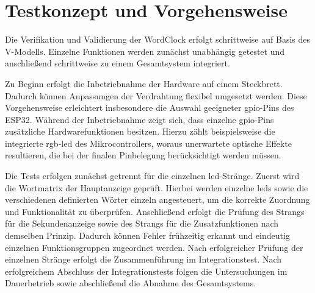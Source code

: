 \section{Testkonzept und Vorgehensweise}
Die Verifikation und Validierung der WordClock erfolgt schrittweise auf Basis des V-Modells. 
Einzelne Funktionen werden zunächst unabhängig getestet und anschließend schrittweise zu einem Gesamtsystem integriert.  

Zu Beginn erfolgt die Inbetriebnahme der Hardware auf einem Steckbrett.  
Dadurch können Anpassungen der Verdrahtung flexibel umgesetzt werden.  
Diese Vorgehensweise erleichtert insbesondere die Auswahl geeigneter \gls{gpio}-Pins des ESP32.  
Während der Inbetriebnahme zeigt sich, dass einzelne \gls{gpio}-Pins zusätzliche Hardwarefunktionen besitzen.  
Hierzu zählt beispielsweise die integrierte \gls{rgb}-\gls{led} des Mikrocontrollers, woraus unerwartete optische Effekte resultieren, die bei der finalen Pinbelegung berücksichtigt werden müssen.

Die Tests erfolgen zunächst getrennt für die einzelnen \gls{led}-Stränge.  
Zuerst wird die Wortmatrix der Hauptanzeige geprüft. 
Hierbei werden einzelne \gls{led}s sowie die verschiedenen definierten Wörter einzeln angesteuert, um die korrekte Zuordnung und Funktionalität zu überprüfen.  
Anschließend erfolgt die Prüfung des Strangs für die Sekundenanzeige sowie des Strangs für die Zusatzfunktionen nach demselben Prinzip.  
Dadurch können Fehler frühzeitig erkannt und eindeutig einzelnen Funktionsgruppen zugeordnet werden.  
Nach erfolgreicher Prüfung der einzelnen Stränge erfolgt die Zusammenführung im Integrationstest.  
Nach erfolgreichem Abschluss der Integrationstests folgen die Untersuchungen im Dauerbetrieb sowie abschließend die Abnahme des Gesamtsystems.